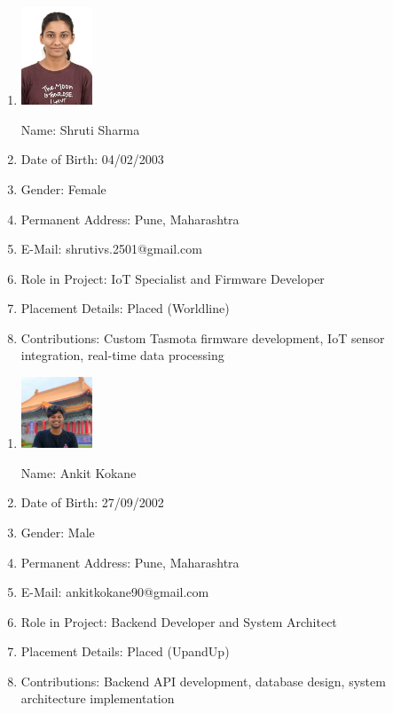 \documentclass[oneside,a4paper,12pt]{book}
\begin{document}
\begin{appendices}
\newpage
\begin{enumerate}
\item \begin{flushright}\includegraphics[width=60pt]{shruti-dp.jpeg}\end{flushright}
Name: Shruti Sharma 
\item Date of Birth: 04/02/2003
\item Gender: Female
\item Permanent Address: Pune, Maharashtra
\item E-Mail: shrutivs.2501@gmail.com
\item Role in Project: IoT Specialist and Firmware Developer
\item Placement Details: Placed (Worldline)
\item Contributions: Custom Tasmota firmware development, IoT sensor integration, real-time data processing
\end{enumerate}

\newpage
\begin{enumerate}
\item \begin{flushright}\includegraphics[width=60pt]{ankit-dp.jpeg}\end{flushright}
Name: Ankit Kokane
\item Date of Birth: 27/09/2002
\item Gender: Male
\item Permanent Address: Pune, Maharashtra
\item E-Mail: ankitkokane90@gmail.com
\item Role in Project: Backend Developer and System Architect
\item Placement Details: Placed (UpandUp)
\item Contributions: Backend API development, database design, system architecture implementation
\end{enumerate}


\end{appendices}
\end{document}
